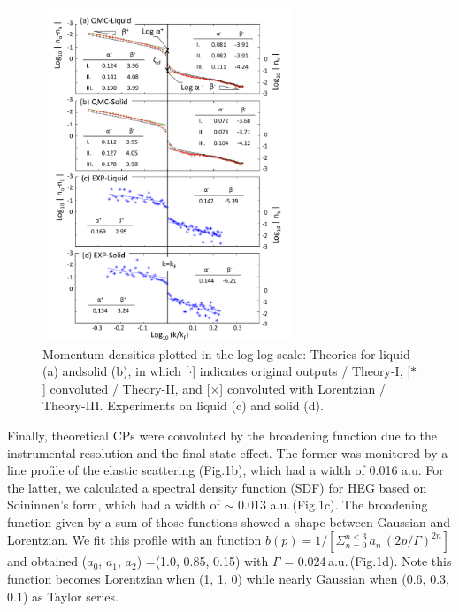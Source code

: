 \documentclass[twocolumn,showpacs,showkeys,fleqn,prl,superscriptaddress]{revtex4}%
\begin{document}
\begin{figure}
\includegraphics[bb= 70 10 500 700, width=7.5cm]{fig3.pdf}
\caption{Momentum densities plotted in the log-log scale:  Theories for liquid (a) andsolid (b), in which  [$\cdot$] indicates original outputs / Theory-I, [$*$] convoluted / Theory-II, and [$\times$] convoluted with Lorentzian / Theory-III.  Experiments on liquid (c) and solid (d).
} 
\label{Fig.3}
\end{figure}


Finally, theoretical CPs were convoluted by the broadening function due to the instrumental resolution and the final state effect. 
The former was monitored by a line profile of the elastic scattering (Fig.1b), which had a width of 0.016 a.u.
For the latter, we calculated a spectral density function (SDF) for HEG based on Soininnen's form\cite{soi01}, which had a width of $\sim$ 0.013 a.u.\,(Fig.1c).
The broadening function given by a sum of those functions showed a shape between Gaussian and Lorentzian.    
We fit this profile with an function $b(p) =1/ [ \Sigma_{n=0}^{n<3}\,a_n\,(2p / \Gamma )^{2n} ]$ and obtained ($a_0$, $a_1$, $a_2$) =(1.0, 0.85, 0.15) with $\Gamma$ = 0.024\,a.u.\,(Fig.1d).
Note this function becomes Lorentzian when (1, 1, 0) while nearly Gaussian when (0.6, 0.3, 0.1) as Taylor series. 
\end{document}
